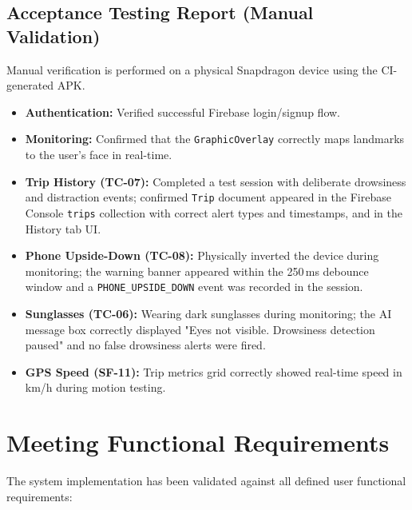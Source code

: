\documentclass[11pt]{report}
\begin{document}
\subsection{Acceptance Testing Report (Manual Validation)}  %
Manual verification is performed on a physical Snapdragon device using the CI-generated APK.
\begin{itemize}
    \item \textbf{Authentication:} Verified successful Firebase login/signup flow.
    \item \textbf{Monitoring:} Confirmed that the \texttt{GraphicOverlay} correctly maps landmarks to the user's face in real-time.
    \item \textbf{Trip History (TC-07):} Completed a test session with deliberate drowsiness and distraction events; confirmed \texttt{Trip} document appeared in the Firebase Console \texttt{trips} collection with correct alert types and timestamps, and in the History tab UI.
    \item \textbf{Phone Upside-Down (TC-08):} Physically inverted the device during monitoring; the warning banner appeared within the 250\,ms debounce window and a \texttt{PHONE\_UPSIDE\_DOWN} event was recorded in the session.
    \item \textbf{Sunglasses (TC-06):} Wearing dark sunglasses during monitoring; the AI message box correctly displayed "Eyes not visible. Drowsiness detection paused" and no false drowsiness alerts were fired.
    \item \textbf{GPS Speed (SF-11):} Trip metrics grid correctly showed real-time speed in km/h during motion testing.
\end{itemize}

\section{Meeting Functional Requirements}  %

The system implementation has been validated against all defined user functional requirements:
\end{document}
